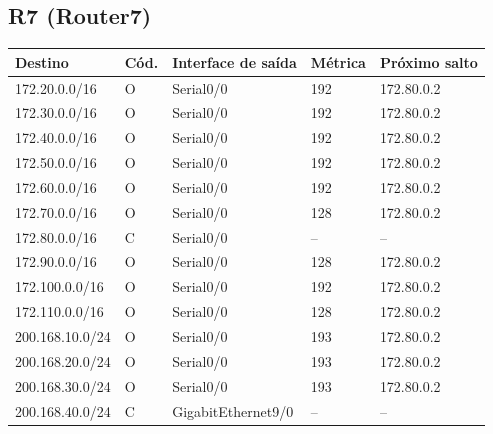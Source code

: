 \subsection*{R7 (Router7)}
\begin{tabular}{@{}llllp{3.6cm}@{}}\toprule Destino & Cód. & Interface de saída & Métrica & Próximo salto\\\midrule
172.20.0.0/16 & O & Serial0/0 & 192 & 172.80.0.2\\
172.30.0.0/16 & O & Serial0/0 & 192 & 172.80.0.2\\
172.40.0.0/16 & O & Serial0/0 & 192 & 172.80.0.2\\
172.50.0.0/16 & O & Serial0/0 & 192 & 172.80.0.2\\
172.60.0.0/16 & O & Serial0/0 & 192 & 172.80.0.2\\
172.70.0.0/16 & O & Serial0/0 & 128 & 172.80.0.2\\
172.80.0.0/16 & C & Serial0/0 & -- & --\\
172.90.0.0/16 & O & Serial0/0 & 128 & 172.80.0.2\\
172.100.0.0/16 & O & Serial0/0 & 192 & 172.80.0.2\\
172.110.0.0/16 & O & Serial0/0 & 128 & 172.80.0.2\\
200.168.10.0/24 & O & Serial0/0 & 193 & 172.80.0.2\\
200.168.20.0/24 & O & Serial0/0 & 193 & 172.80.0.2\\
200.168.30.0/24 & O & Serial0/0 & 193 & 172.80.0.2\\
200.168.40.0/24 & C & GigabitEthernet9/0 & -- & --\\
\bottomrule\end{tabular}
